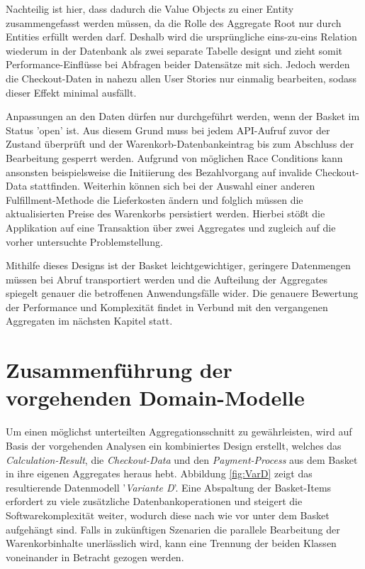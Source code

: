 Nachteilig ist hier, dass dadurch die Value Objects zu einer Entity zusammengefasst werden müssen, da die Rolle des Aggregate Root nur durch Entities erfüllt werden darf. Deshalb wird die ursprüngliche eins-zu-eins Relation wiederum in der Datenbank als zwei separate Tabelle designt und zieht somit Performance-Einflüsse bei Abfragen beider Datensätze mit sich. Jedoch werden die Checkout-Daten in nahezu allen User Stories nur einmalig bearbeiten, sodass dieser Effekt minimal ausfällt.

Anpassungen an den Daten dürfen nur durchgeführt werden, wenn der Basket im Status 'open' ist. Aus diesem Grund muss bei jedem API-Aufruf zuvor der Zustand überprüft und der Warenkorb-Datenbankeintrag bis zum Abschluss der Bearbeitung gesperrt werden. Aufgrund von möglichen Race Conditions kann ansonsten beispielsweise die Initiierung des Bezahlvorgang auf invalide Checkout-Data stattfinden. Weiterhin können sich bei der Auswahl einer anderen Fulfillment-Methode die Lieferkosten ändern und folglich müssen die aktualisierten Preise des Warenkorbs persistiert werden. Hierbei stößt die Applikation auf eine Transaktion über zwei Aggregates und zugleich auf die vorher untersuchte Problemstellung.

Mithilfe dieses Designs ist der Basket leichtgewichtiger, geringere Datenmengen müssen bei Abruf transportiert werden und die Aufteilung der Aggregates spiegelt genauer die betroffenen Anwendungsfälle wider. Die genauere Bewertung der Performance und Komplexität findet in Verbund mit den vergangenen Aggregaten im nächsten Kapitel statt.


\section{Zusammenführung der vorgehenden Domain-Modelle}

Um einen möglichst unterteilten Aggregationsschnitt zu gewährleisten, wird auf Basis der vorgehenden Analysen ein kombiniertes Design erstellt, welches das \emph{Calculation-Result}, die \emph{Checkout-Data} und den \emph{Payment-Process} aus dem Basket in ihre eigenen Aggregates heraus hebt. Abbildung \ref{fig:VarD} zeigt das resultierende Datenmodell '\emph{Variante D}'. Eine Abspaltung der Basket-Items erfordert zu viele zusätzliche Datenbankoperationen und steigert die Softwarekomplexität weiter, wodurch diese nach wie vor unter dem Basket aufgehängt sind. Falls in zukünftigen Szenarien die parallele Bearbeitung der Warenkorbinhalte unerlässlich wird, kann eine Trennung der beiden Klassen voneinander in Betracht gezogen werden.  

